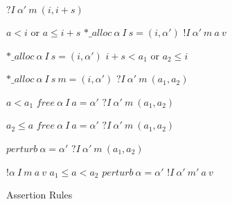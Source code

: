\documentclass{article}
\begin{document}
\begin{figure}
\begin{minipage}{0.33\textwidth}
  \end{minipage}
  \begin{minipage}{0.33\textwidth}
             {\(? I ~ \alpha' ~ m ~ (i,i+s)\)}
  \end{minipage}
  \begin{minipage}{0.33\textwidth}
                      {\(a < i\) or \(a \leq i+s\)}
                      {\(\mathit{*\_alloc} ~ \alpha ~ I ~ s = (i, \alpha')\)}
                      {\(! I ~ \alpha' ~ m ~ a ~ v\)}
  \end{minipage}
  \begin{minipage}{0.33\textwidth}
               {\(\mathit{*\_alloc} ~ \alpha ~ I ~ s = (i, \alpha')\)}
               {\(i+s < a_1\) or \(a_2 \leq i\)}
  \end{minipage}
  \begin{minipage}{0.33\textwidth}
               {\(\mathit{*\_alloc} ~ \alpha ~ I ~ s ~ m = (i, \alpha')\)}
               {\(? I ~ \alpha' ~ m ~ (a_1,a_2)\)}
  \end{minipage}
  \begin{minipage}{0.33\textwidth}
                      {\(a < a_1\)}
                      {\(\mathit{free} ~ \alpha ~ I ~ a = \alpha'\)}
                      {\(? I ~ \alpha' ~ m ~ (a_1,a_2)\)}
  \end{minipage}
  \begin{minipage}{0.33\textwidth}
                      {\(a_2 \leq a\)}
                      {\(\mathit{free} ~ \alpha ~ I ~ a = \alpha'\)}
                      {\(? I ~ \alpha' ~ m ~ (a_1,a_2)\)}
  \end{minipage}
  \begin{minipage}{0.33\textwidth}
               {\(\mathit{perturb} ~ \alpha = \alpha'\)}
               {\(? I ~ \alpha' ~ m ~ (a_1,a_2)\)}
  \end{minipage}
  \begin{minipage}{0.33\textwidth}
                  {\(! \alpha ~ I ~ m ~ a ~ v\)}
                  {\(a_1 \leq a < a_2\)}
                  {\(\mathit{perturb} ~ \alpha = \alpha'\)}
                  {\(! I ~ \alpha' ~ m' ~ a ~ v\)}
  \end{minipage}

  \caption{Assertion Rules}
  \label{fig:asserts}
\end{figure}
\end{document}
